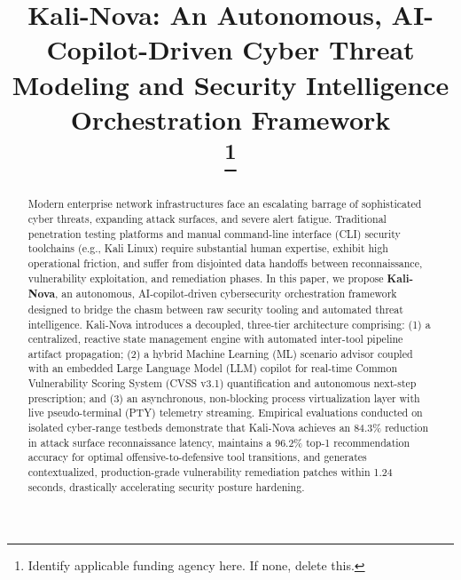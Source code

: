 \documentclass[conference]{IEEEtran}
\begin{document}
\title{Kali-Nova: An Autonomous, AI-Copilot-Driven Cyber Threat Modeling and Security Intelligence Orchestration Framework\\
\thanks{Identify applicable funding agency here. If none, delete this.}
}

\author{
}

\maketitle

\begin{abstract}
Modern enterprise network infrastructures face an escalating barrage of sophisticated cyber threats, expanding attack surfaces, and severe alert fatigue. Traditional penetration testing platforms and manual command-line interface (CLI) security toolchains (e.g., Kali Linux) require substantial human expertise, exhibit high operational friction, and suffer from disjointed data handoffs between reconnaissance, vulnerability exploitation, and remediation phases. In this paper, we propose \textbf{Kali-Nova}, an autonomous, AI-copilot-driven cybersecurity orchestration framework designed to bridge the chasm between raw security tooling and automated threat intelligence. Kali-Nova introduces a decoupled, three-tier architecture comprising: (1) a centralized, reactive state management engine with automated inter-tool pipeline artifact propagation; (2) a hybrid Machine Learning (ML) scenario advisor coupled with an embedded Large Language Model (LLM) copilot for real-time Common Vulnerability Scoring System (CVSS v3.1) quantification and autonomous next-step prescription; and (3) an asynchronous, non-blocking process virtualization layer with live pseudo-terminal (PTY) telemetry streaming. Empirical evaluations conducted on isolated cyber-range testbeds demonstrate that Kali-Nova achieves an 84.3\% reduction in attack surface reconnaissance latency, maintains a 96.2\% top-1 recommendation accuracy for optimal offensive-to-defensive tool transitions, and generates contextualized, production-grade vulnerability remediation patches within 1.24 seconds, drastically accelerating security posture hardening.
\end{abstract}
\end{document}
